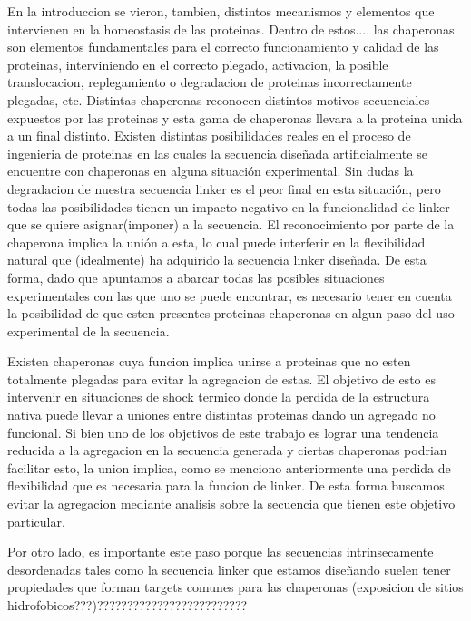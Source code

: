 En la introduccion se vieron, tambien, distintos mecanismos y elementos que intervienen en la homeostasis de las proteinas. Dentro de estos.... 
las chaperonas son elementos fundamentales para el correcto funcionamiento y calidad de las proteinas, interviniendo en el correcto plegado, activacion, la posible translocacion, replegamiento o degradacion de proteinas incorrectamente plegadas, etc.
Distintas chaperonas reconocen distintos motivos secuenciales expuestos por las proteinas y esta gama de chaperonas llevara a la proteina unida a un final distinto.
Existen distintas posibilidades reales en el proceso de ingenieria de proteinas en las cuales la secuencia diseñada artificialmente se encuentre con chaperonas en alguna situación experimental. Sin dudas la degradacion de nuestra secuencia linker es el peor final en esta situación, 
pero todas las posibilidades tienen un impacto negativo en la funcionalidad de linker que se quiere asignar(imponer) a la secuencia. El reconocimiento por parte de la chaperona implica la unión a esta, lo cual puede interferir en la flexibilidad natural que (idealmente) ha adquirido la secuencia linker diseñada. 
De esta forma, dado que apuntamos a abarcar todas las posibles situaciones experimentales con las que uno se puede encontrar, es necesario tener en cuenta la posibilidad de que esten presentes proteinas chaperonas en algun paso del uso experimental de la secuencia. 
 
Existen chaperonas cuya funcion implica unirse a proteinas que no esten totalmente plegadas para evitar la agregacion de estas. El objetivo de esto es intervenir en situaciones de shock termico donde la perdida de la estructura nativa puede llevar a uniones entre distintas proteinas dando un agregado no funcional.
Si bien uno de los objetivos de este trabajo es lograr una tendencia reducida a la agregacion en la secuencia generada y ciertas chaperonas podrian facilitar esto, la union implica, como se menciono anteriormente una perdida de flexibilidad que es necesaria para la funcion de linker. 
De esta forma buscamos evitar la agregacion mediante analisis sobre la secuencia que tienen este objetivo particular.

Por otro lado, es importante este paso porque las secuencias intrinsecamente desordenadas tales como la secuencia linker que estamos diseñando suelen tener propiedades que forman targets comunes para las chaperonas (exposicion de sitios hidrofobicos???)?????????????????????????




